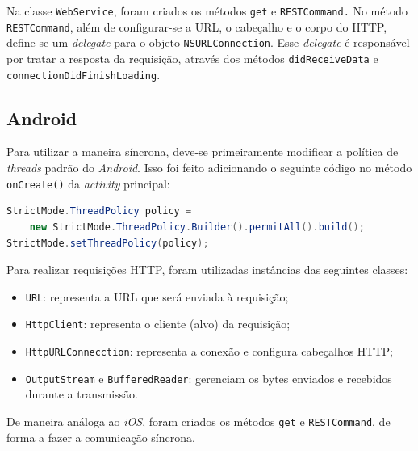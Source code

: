     Na classe \texttt{WebService}, foram criados os métodos \texttt{get} e \texttt{RESTCommand.} No método \texttt{RESTCommand}, além de configurar-se a \ac{URL}, o cabeçalho e o corpo do \ac{HTTP}, define-se um \emph{delegate} para o objeto \texttt{NSURLConnection}. Esse \emph{delegate} é responsável por tratar a resposta da requisição, através dos métodos \texttt{didReceiveData} e \texttt{connectionDidFinishLoading}.
     
     
    \subsection{Android}
     
            Para utilizar a maneira síncrona, deve-se primeiramente modificar a política de \emph{threads} padrão do \emph{Android}. Isso foi feito adicionando o seguinte código no método \texttt{onCreate()} da \emph{activity} principal:
\begin{lstlisting}[language=Java]              
StrictMode.ThreadPolicy policy = 
    new StrictMode.ThreadPolicy.Builder().permitAll().build();
StrictMode.setThreadPolicy(policy);
 \end{lstlisting}       
    
	Para realizar requisições \ac{HTTP}, foram utilizadas instâncias das seguintes classes:
\begin{itemize}
\item \texttt{URL}: representa a \ac{URL} que será enviada à requisição;
\item \texttt{HttpClient}: representa o cliente (alvo) da requisição;
\item \texttt{HttpURLConnecction}: representa a conexão e configura cabeçalhos \ac{HTTP};
\item \texttt{OutputStream} e \texttt{BufferedReader}: gerenciam os bytes enviados e recebidos durante a transmissão.
\end{itemize}
    
	De maneira análoga ao \emph{iOS}, foram criados os métodos \texttt{get} e \texttt{RESTCommand}, de forma a fazer a comunicação síncrona.

